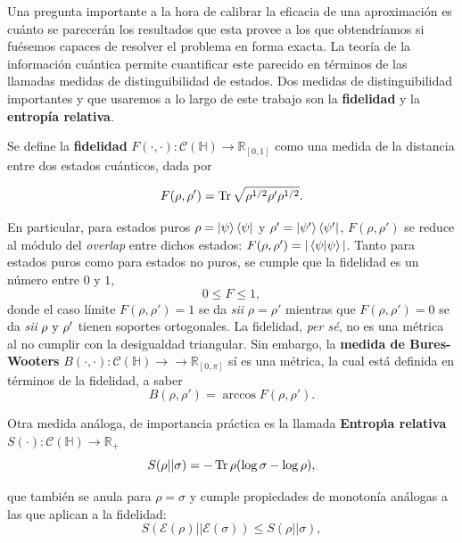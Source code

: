 \documentclass{report} %
\newcommand{\sii}{\textit{sii }}
\numberwithin{equation}{section}
\begin{document}
Una pregunta importante a la hora de calibrar la eficacia de una aproximación es cuánto se parecerán los resultados que esta provee a los que obtendríamos si fuésemos capaces de resolver el problema en forma exacta. La teoría de la información cuántica permite cuantificar este parecido en términos de las llamadas medidas de distinguibilidad de estados. Dos medidas de distinguibilidad importantes y que usaremos a lo largo de este trabajo son la \textbf{fidelidad} \cite{Nielsen.00} y la \textbf{entropía relativa}.

Se define la \textbf{fidelidad} $F(\cdot, \cdot): \mathcal{C}(\mathds{H}) \rightarrow \mathds{R}_{[0,1]}$ \cite{Nielsen.00} como una medida de la distancia entre dos estados cuánticos, dada por

\begin{equation}
    F(\rho,\rho') = \Tr \sqrt{\rho^{1/2}\rho' \rho^{1/2}}.
    \label{fidelity}
\end{equation}

En particular, para estados puros $\rho = \ket{\psi} \bra{\psi}$ y $\rho' = \ket{\psi'}\bra{\psi'}$, $F(\rho,\rho')$ se reduce al módulo del \textit{overlap} entre dichos estados: $F(\rho,\rho') = |\bra{\psi}\ket{\psi}|$.
Tanto para estados puros como para estados no puros, se cumple que la fidelidad es un número entre $0$ y $1$, 
$$
0 \leq F \leq 1,
$$
donde el caso límite $F(\rho,\rho')=1$ se da \sii $\rho = \rho'$ mientras que $F(\rho,\rho')=0$ se da \sii $\rho \textnormal{ y } \rho'$ tienen soportes ortogonales. La fidelidad, \textit{per sé}, no es una métrica al no cumplir con la desigualdad triangular. Sin embargo, la \textbf{medida de Bures-Wooters} $B(\cdot, \cdot): \mathcal{C}(\mathds{H}) \rightarrow \rightarrow \mathds{R}_{[0, \pi]}$ \cite{Nielsen.00} sí es una métrica, la cual está definida en términos de la fidelidad, a saber
\begin{equation}
    B(\rho,\rho') = \arccos F(\rho,\rho').
    \label{Bures-Wooters}
\end{equation}

Otra medida análoga, de importancia práctica es la llamada \textbf{Entrop\'{\i}a relativa} $S(\cdot): \mathcal{C}(\mathds{H}) \rightarrow \mathds{R}_{+}$ \cite{reviewvedralqrs}
\begin{equation}
S(\rho||\sigma)=-\Tr \rho(\log \sigma-\log \rho),
    \label{relative entropy}
\end{equation}

que también se anula para $\rho=\sigma$ y cumple propiedades de monotonía análogas a las que aplican a la fidelidad:
$$
S({\mathcal E}(\rho)||{\mathcal E}(\sigma))\leq S(\rho||\sigma),
$$
\end{document}
